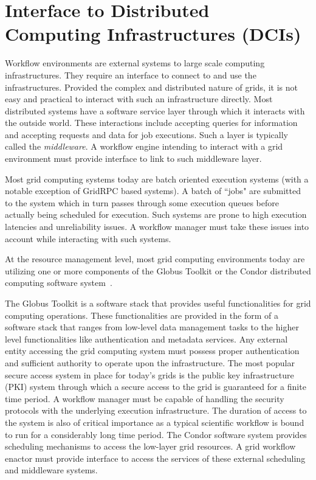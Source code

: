 
\section{Interface to Distributed Computing Infrastructures (DCIs)} \label{sec:inter}
Workflow environments are external systems to large scale computing
infrastructures. They require an interface to connect to and use the
infrastructures. Provided the complex and distributed nature of grids, it is
not easy and practical to interact with such an infrastructure directly. Most
distributed systems have a software service layer through which it interacts
with the outside world. These interactions include accepting queries for
information and accepting requests and data for job executions. Such a layer is
typically called the \textit{middleware}. A workflow engine intending to
interact with a grid environment must provide interface to link to such
middleware layer. 

Most grid computing systems today are batch oriented execution systems (with a
notable exception of GridRPC \cite{seymour-nakada-etal:2002} based systems). A
batch of ``jobs" are submitted to the system which in turn passes through some
execution queues before actually being scheduled for execution. Such systems
are prone to high execution latencies and unreliability issues. A workflow
manager must take these issues into account while interacting with such
systems.

At the resource management level, most grid computing environments today are
utilizing one or more components of the Globus Toolkit
\cite{foster-kesselman:1997} or the Condor distributed computing software
system~\cite{dagman}.

The Globus Toolkit is a software stack that provides useful functionalities for
grid computing operations. These functionalities are provided in the form of a
software stack that ranges from low-level data management tasks to the higher
level functionalities like authentication and metadata services. Any external
entity accessing the grid computing system must possess proper authentication
and sufficient authority to operate upon the infrastructure. The most popular
secure access system in place for today's grids is the public key
infrastructure (PKI) system through which a secure access to the grid is
guaranteed for a finite time period. A workflow manager must be capable of
handling the security protocols with the underlying execution infrastructure.
The duration of access to the system is also of critical importance as a
typical scientific workflow is bound to run for a considerably long time
period. The Condor software system provides scheduling mechanisms to access the
low-layer grid resources. A grid workflow enactor must provide interface to
access the services of these external scheduling and middleware systems. 

